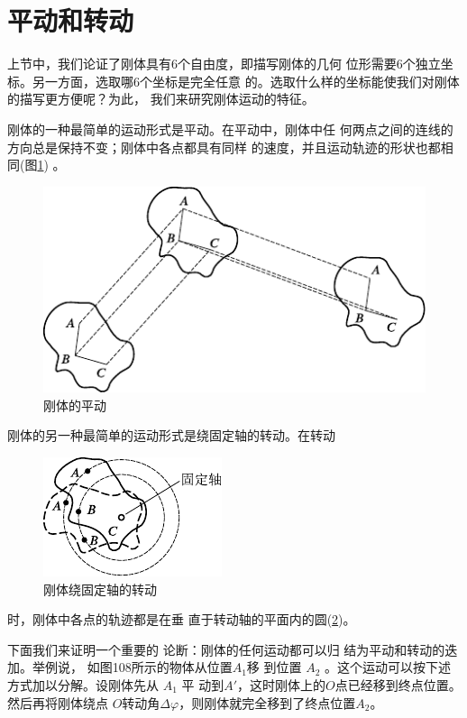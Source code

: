 \section{平动和转动}\label{sec:10.02}

上节中，我们论证了刚体具有$ 6 $个自由度，即描写刚体的几何
位形需要$ 6 $个独立坐标。另一方面，选取哪$ 6 $个坐标是完全任意
的。选取什么样的坐标能使我们对刚体的描写更方便呢？为此，
我们来研究刚体运动的特征。

刚体的一种最简单的运动形式是平动。在平动中，刚体中任
\clearpage\noindent
何两点之间的连线的方向总是保持不变；刚体中各点都具有同样
的速度，并且运动轨迹的形状也都相同(图\ref{fig:10.06})  。

\begin{figure}[h]
    \centering
    \includegraphics{figure/fig10.06}
    \caption{刚体的平动}
    \label{fig:10.06}
\end{figure}

刚体的另一种最简单的运动形式是绕固定轴的转动。在转动
\begin{figure}
    \centering
    \includegraphics{figure/fig10.07}
    \caption{刚体绕固定轴的转动}
    \label{fig:10.07}
\end{figure}
时，刚体中各点的轨迹都是在垂
直于转动轴的平面内的圆(\ref{fig:10.07})。

下面我们来证明一个重要的
论断：刚体的任何运动都可以归
结为平动和转动的迭加。举例说，
如图108所示的物体从位置$  A _ { 1 }   $移
到位置 $ A _ { 2 } $  。这个运动可以按下述方式加以分解。设刚体先从 $ A _ { 1 } $ 平
动到$ A' $，这时刚体上的$ O $点已经移到终点位置。然后再将刚体绕点
$ O $转动角$ \Delta \varphi $，则刚体就完全移到了终点位置$ A_2 $。

